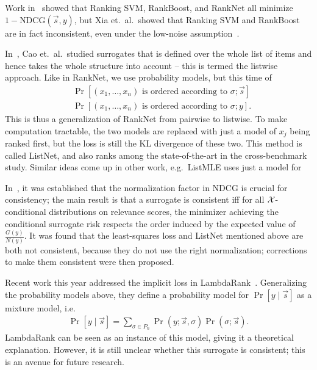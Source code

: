 Work in~\cite{ranking-measures-and-loss-functions} showed that Ranking SVM,
RankBoost, and RankNet all minimize $1 - \text{NDCG}(\vec{s}, y)$, but
Xia et.\ al.\ showed that Ranking SVM and RankBoost are in fact inconsistent,
even under the low-noise assumption~\cite{xia2008listwise}.

In~\cite{from-pairwise-to-listwise}, Cao et.\ al.\ studied 
surrogates that is defined over the whole list of items and hence takes the
whole structure into account -- this is termed the listwise approach. Like
in RankNet, we use probability models, but this time of
\begin{align*}
  &\Pr[\text{$(x_1, \ldots, x_n)$ is ordered according to $\sigma$} ; \vec{s}] \\
  &\Pr[\text{$(x_1, \ldots, x_n)$ is ordered according to $\sigma$} ; y].
\end{align*}
This is thus a generalization of RankNet from pairwise to listwise. To make
computation tractable, the two models are replaced with just a model of
$x_j$ being ranked first, but the loss is still the KL divergence of these two.
This method is called ListNet, and also ranks among the state-of-the-art in the
cross-benchmark study. Similar ideas come up in other work, e.g.\ ListMLE
uses just a model for 

In~\cite{ndcg-consistency}, it was established that the normalization factor
in NDCG is crucial for consistency; the main result is that a surrogate is
consistent iff for all ${\mathcal X}$-conditional distributions on relevance scores,
the minimizer achieving the conditional surrogate risk
respects the order induced by the expected value of $\frac{G(y)}{N(y)}$.
It was found that the
least-squares loss and ListNet mentioned above are both not consistent, because
they do not use the right normalization; corrections to make them consistent
were then proposed.

Recent work this year addressed the implicit loss in LambdaRank~\cite{cikm}.
Generalizing the probability models above, they define a probability model for
$\Pr[y \mid \vec{s}]$ as a mixture model, i.e.\
\begin{align*}
  \Pr[y \mid \vec{s}] = \sum_{\sigma \in P_n} \Pr(y ; \vec{s}, \sigma) \Pr(\sigma ; \vec{s}).
\end{align*}
LambdaRank can be seen as an instance of this model, giving it a theoretical
explanation. 
However, it is still unclear whether this surrogate is consistent; this is an
avenue for future research. 
